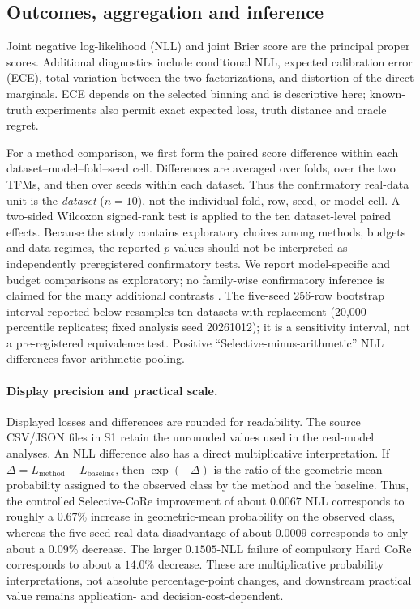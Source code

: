 \documentclass[a4paper,fleqn]{cas-sc}
\begin{document}
\subsection{Outcomes, aggregation and inference}
Joint negative log-likelihood (NLL) and joint Brier score are the principal proper scores. Additional diagnostics include conditional NLL, expected calibration error (ECE), total variation between the two factorizations, and distortion of the direct marginals. ECE depends on the selected binning and is descriptive here; known-truth experiments also permit exact expected loss, truth distance and oracle regret.

For a method comparison, we first form the paired score difference within each dataset--model--fold--seed cell. Differences are averaged over folds, over the two TFMs, and then over seeds within each dataset. Thus the confirmatory real-data unit is the \emph{dataset} ($n=10$), not the individual fold, row, seed, or model cell. A two-sided Wilcoxon signed-rank test is applied to the ten dataset-level paired effects. Because the study contains exploratory choices among methods, budgets and data regimes, the reported $p$-values should not be interpreted as independently preregistered confirmatory tests. We report model-specific and budget comparisons as exploratory; no family-wise confirmatory inference is claimed for the many additional contrasts \citep{demsar2006comparisons}. The five-seed 256-row bootstrap interval reported below resamples ten datasets with replacement (20,000 percentile replicates; fixed analysis seed 20261012); it is a sensitivity interval, not a pre-registered equivalence test. Positive ``Selective-minus-arithmetic'' NLL differences favor arithmetic pooling.

\paragraph{Display precision and practical scale.} Displayed losses and differences are rounded for readability. The source CSV/JSON files in S1 retain the unrounded values used in the real-model analyses. An NLL difference also has a direct multiplicative interpretation. If $\Delta=L_{\mathrm{method}}-L_{\mathrm{baseline}}$, then $\exp(-\Delta)$ is the ratio of the geometric-mean probability assigned to the observed class by the method and the baseline. Thus, the controlled Selective-CoRe improvement of about $0.0067$ NLL corresponds to roughly a $0.67\%$ increase in geometric-mean probability on the observed class, whereas the five-seed real-data disadvantage of about $0.0009$ corresponds to only about a $0.09\%$ decrease. The larger $0.1505$-NLL failure of compulsory Hard CoRe corresponds to about a $14.0\%$ decrease. These are multiplicative probability interpretations, not absolute percentage-point changes, and downstream practical value remains application- and decision-cost-dependent.
\end{document}
